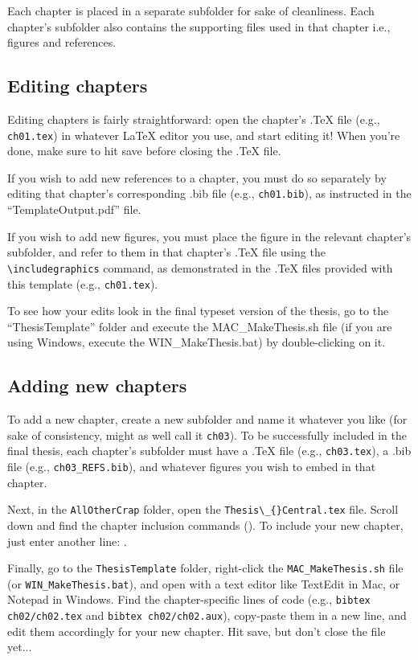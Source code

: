 \documentclass[12pt]{report} %
\begin{document}
Each chapter is placed in a separate subfolder for sake of cleanliness. Each chapter's subfolder also contains the supporting files used in that chapter i.e., figures and references.

\subsection*{Editing chapters}
Editing chapters is fairly straightforward: open the chapter's .TeX file (e.g., \verb|ch01.tex|) in whatever \LaTeX{} editor you use, and start editing it! When you're done, make sure to hit save before closing the .TeX file. 

If you wish to add new references to a chapter, you must do so separately by editing that chapter's corresponding .bib file (e.g., \verb|ch01.bib|), as instructed in the ``TemplateOutput.pdf'' file.

If you wish to add new figures, you must place the figure in the relevant chapter's subfolder, and refer to them in that chapter's .TeX file using the \verb|\includegraphics| command, as demonstrated in the .TeX files provided with this template (e.g., \verb|ch01.tex|).

To see how your edits look in the final typeset version of the thesis, go to the ``ThesisTemplate'' folder and execute the MAC\_{}MakeThesis.sh file (if you are using Windows, execute the WIN\_{}MakeThesis.bat) by double-clicking on it.

\subsection*{Adding new chapters}
To add a new chapter, create a new subfolder and name it whatever you like (for sake of consistency, might as well call it \verb|ch03|). To be successfully included in the final thesis, each chapter's subfolder must have a .TeX file (e.g., \verb|ch03.tex|), a .bib file (e.g., \verb|ch03_REFS.bib|), and whatever figures you wish to embed in that chapter.

Next, in the \verb|AllOtherCrap| folder, open the \verb|Thesis\_{}Central.tex| file. Scroll down and find the chapter inclusion commands (\verb||). To include your new chapter, just enter another line: \verb||.

Finally, go to the \verb|ThesisTemplate| folder, right-click the \verb|MAC_MakeThesis.sh| file (or \verb|WIN_MakeThesis.bat|), and open with a text editor like TextEdit in Mac, or Notepad in Windows. Find the chapter-specific lines of code (e.g., \verb|bibtex ch02/ch02.tex| and \verb|bibtex ch02/ch02.aux|), copy-paste them in a new line, and edit them accordingly for your new chapter. Hit save, but don't close the file yet...
\end{document}
